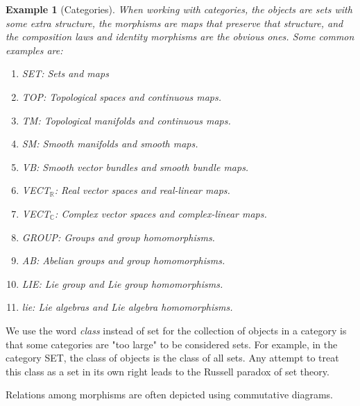 \documentclass{article}
\newtheorem{example}{Example}[section]
\theoremstyle{remark}
\theoremstyle{definition}
\begin{document}
\begin{example}[Categories]
When working with categories, the objects are sets with some extra structure, the morphisms are maps that preserve that structure, and the composition laws and identity morphisms are the obvious ones. Some common examples are: 
\begin{enumerate}
    \item SET: Sets and maps 
    \item TOP: Topological spaces and continuous maps. 
    \item TM: Topological manifolds and continuous maps. 
    \item SM: Smooth manifolds and smooth maps. 
    \item VB: Smooth vector bundles and smooth bundle maps. 
    \item VECT$_\mathbb{R}$: Real vector spaces and real-linear maps. 
    \item VECT$_\mathbb{C}$: Complex vector spaces and complex-linear maps. 
    \item GROUP: Groups and group homomorphisms. 
    \item AB: Abelian groups and group homomorphisms. \item LIE: Lie group and Lie group homomorphisms. 
    \item lie: Lie algebras and Lie algebra homomorphisms. 
\end{enumerate}
\end{example}

We use the word \textit{class} instead of set for the collection of objects in a category is that some categories are "too large" to be considered sets. For example, in the category SET, the class of objects is the class of all sets. Any attempt to treat this class as a set in its own right leads to the Russell paradox of set theory. 

Relations among morphisms are often depicted using commutative diagrams. 
\end{document}
